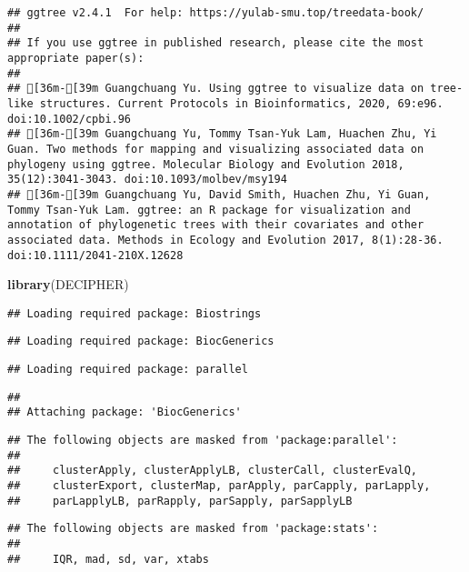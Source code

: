 \documentclass[
]{article}
\newenvironment{Shaded}{\begin{snugshade}}{\end{snugshade}}
\newcommand{\KeywordTok}[1]{\textcolor[rgb]{0.13,0.29,0.53}{\textbf{#1}}}
\newcommand{\NormalTok}[1]{#1}
\begin{document}
\begin{verbatim}
## ggtree v2.4.1  For help: https://yulab-smu.top/treedata-book/
## 
## If you use ggtree in published research, please cite the most appropriate paper(s):
## 
## [36m-[39m Guangchuang Yu. Using ggtree to visualize data on tree-like structures. Current Protocols in Bioinformatics, 2020, 69:e96. doi:10.1002/cpbi.96
## [36m-[39m Guangchuang Yu, Tommy Tsan-Yuk Lam, Huachen Zhu, Yi Guan. Two methods for mapping and visualizing associated data on phylogeny using ggtree. Molecular Biology and Evolution 2018, 35(12):3041-3043. doi:10.1093/molbev/msy194
## [36m-[39m Guangchuang Yu, David Smith, Huachen Zhu, Yi Guan, Tommy Tsan-Yuk Lam. ggtree: an R package for visualization and annotation of phylogenetic trees with their covariates and other associated data. Methods in Ecology and Evolution 2017, 8(1):28-36. doi:10.1111/2041-210X.12628
\end{verbatim}

\begin{Shaded}
\begin{Highlighting}[]
\KeywordTok{library}\NormalTok{(DECIPHER)}
\end{Highlighting}
\end{Shaded}

\begin{verbatim}
## Loading required package: Biostrings
\end{verbatim}

\begin{verbatim}
## Loading required package: BiocGenerics
\end{verbatim}

\begin{verbatim}
## Loading required package: parallel
\end{verbatim}

\begin{verbatim}
## 
## Attaching package: 'BiocGenerics'
\end{verbatim}

\begin{verbatim}
## The following objects are masked from 'package:parallel':
## 
##     clusterApply, clusterApplyLB, clusterCall, clusterEvalQ,
##     clusterExport, clusterMap, parApply, parCapply, parLapply,
##     parLapplyLB, parRapply, parSapply, parSapplyLB
\end{verbatim}

\begin{verbatim}
## The following objects are masked from 'package:stats':
## 
##     IQR, mad, sd, var, xtabs
\end{verbatim}
\end{document}
